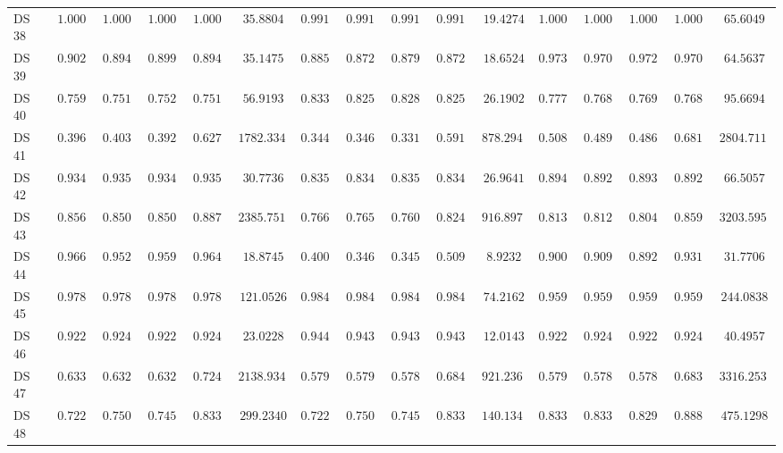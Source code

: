 {\begin{longtable}{|l|ccccc|ccccc|ccccc|}
		DS 38 & $1.0000$ & $1.0000$ & $1.0000$ & $1.0000$ & $35.8804$ & $0.9912$ & $0.9917$ & $0.9911$ & $0.9917$ & $19.4274$ & $1.0000$ & $1.0000$ & $1.0000$ & $1.0000$ & $65.6049$ \\
		DS 39 & $0.9027$ & $0.8941$ & $0.8995$ & $0.8941$ & $35.1475$ & $0.8850$ & $0.8721$ & $0.8795$ & $0.8721$ & $18.6524$ & $\boldsymbol{0.9735}$ & $\boldsymbol{0.9700}$ & $\boldsymbol{0.9729}$ & $\boldsymbol{0.9700}$ & $64.5637$ \\
		DS 40 & $0.7593$ & $0.7510$ & $0.7524$ & $0.7510$ & $56.9193$ & $\boldsymbol{0.8333}$ & $\boldsymbol{0.8255}$ & $\boldsymbol{0.8286}$ & $\boldsymbol{0.8255}$ & $26.1902$ & $0.7778$ & $0.7683$ & $0.7699$ & $0.7683$ & $95.6694$ \\
		DS 41 & $0.3966$ & $0.4035$ & $0.3927$ & $0.6272$ & $1782.3342$ & $0.3448$ & $0.3464$ & $0.3317$ & $0.5915$ & $878.2943$ & $\boldsymbol{0.5086}$ & $\boldsymbol{0.4898}$ & $\boldsymbol{0.4869}$ & $\boldsymbol{0.6811}$ & $2804.7112$ \\
		DS 42 & $0.9343$ & $0.9356$ & $0.9343$ & $0.9356$ & $30.7736$ & $0.8358$ & $0.8349$ & $0.8353$ & $0.8349$ & $26.9641$ & $0.8942$ & $0.8923$ & $0.8934$ & $0.8923$ & $66.5057$ \\
		DS 43 & $\boldsymbol{0.8564}$ & $\boldsymbol{0.8503}$ & $\boldsymbol{0.8505}$ & $\boldsymbol{0.8877}$ & $2385.7514$ & $0.7660$ & $0.7654$ & $0.7605$ & $0.8240$ & $916.8973$ & $0.8138$ & $0.8127$ & $0.8044$ & $0.8595$ & $3203.5952$ \\
		DS 44 & $0.9667$ & $0.9524$ & $0.9599$ & $0.9643$ & $18.8745$ & $0.4000$ & $0.3460$ & $0.3454$ & $0.5095$ & $8.9232$ & $0.9000$ & $0.9091$ & $0.8924$ & $0.9318$ & $31.7706$ \\
		DS 45 & $0.9780$ & $0.9786$ & $0.9780$ & $0.9786$ & $121.0526$ & $\boldsymbol{0.9843}$ & $\boldsymbol{0.9846}$ & $\boldsymbol{0.9843}$ & $\boldsymbol{0.9846}$ & $74.2162$ & $0.9591$ & $0.9597$ & $0.9591$ & $0.9597$ & $244.0838$ \\
		DS 46 & $0.9222$ & $0.9246$ & $0.9220$ & $0.9246$ & $23.0228$ & $0.9444$ & $0.9430$ & $0.9439$ & $0.9430$ & $12.0143$ & $0.9222$ & $0.9246$ & $0.9220$ & $0.9246$ & $40.4957$ \\
		DS 47 & $\boldsymbol{0.6330}$ & $\boldsymbol{0.6323}$ & $\boldsymbol{0.6329}$ & $\boldsymbol{0.7242}$ & $2138.9342$ & $0.5798$ & $0.5799$ & $0.5783$ & $0.6849$ & $921.2369$ & $0.5798$ & $0.5781$ & $0.5781$ & $0.6836$ & $3316.2531$ \\
		DS 48 & $0.7222$ & $0.7500$ & $0.7453$ & $0.8333$ & $299.2340$ & $0.7222$ & $0.7500$ & $0.7453$ & $0.8333$ & $140.1347$ & $0.8333$ & $0.8333$ & $0.8293$ & $0.8889$ & $475.1298$ \\

\end{longtable}}
